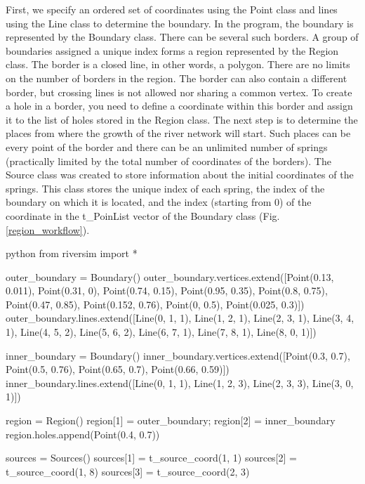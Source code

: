 \documentclass[]{pracamgr}
\begin{document}
      First, we specify an ordered set of coordinates using the Point class and lines using the Line class to determine the boundary. In the program, the boundary is represented by the Boundary class. There can be several such borders. A group of boundaries assigned a unique index forms a region represented by the Region class. The border is a closed line, in other words, a polygon. There are no limits on the number of borders in the region. The border can also contain a different border, but crossing lines is not allowed nor sharing a common vertex. To create a hole in a border, you need to define a coordinate within this border and assign it to the list of holes stored in the Region class. The next step is to determine the places from where the growth of the river network will start. Such places can be every point of the border and there can be an unlimited number of springs (practically limited by the total number of coordinates of the borders). The Source class was created to store information about the initial coordinates of the springs. This class stores the unique index of each spring, the index of the boundary on which it is located, and the index (starting from $0$) of the coordinate in the t\_PoinList vector of the Boundary class (Fig. \ref{region_workflow}).

      \begin{mintedbox}{python}
        from riversim import *

        outer_boundary = Boundary()
        outer_boundary.vertices.extend([Point(0.13, 0.011), Point(0.31, 0), Point(0.74, 0.15), Point(0.95, 0.35), Point(0.8, 0.75), Point(0.47, 0.85), Point(0.152, 0.76), Point(0, 0.5), Point(0.025, 0.3)])
        outer_boundary.lines.extend([Line(0, 1, 1), Line(1, 2, 1), Line(2, 3, 1), Line(3, 4, 1), Line(4, 5, 2), Line(5, 6, 2), Line(6, 7, 1), Line(7, 8, 1), Line(8, 0, 1)])

        inner_boundary = Boundary()
        inner_boundary.vertices.extend([Point(0.3, 0.7), Point(0.5, 0.76), Point(0.65, 0.7), Point(0.66, 0.59)])
        inner_boundary.lines.extend([Line(0, 1, 1), Line(1, 2, 3), Line(2, 3, 3), Line(3, 0, 1)])

        region = Region()
        region[1] = outer_boundary; region[2] = inner_boundary
        region.holes.append(Point(0.4, 0.7))

        sources = Sources()
        sources[1] = t_source_coord(1, 1) 
        sources[2] = t_source_coord(1, 8) 
        sources[3] = t_source_coord(2, 3)\end{mintedbox}
\end{document}
